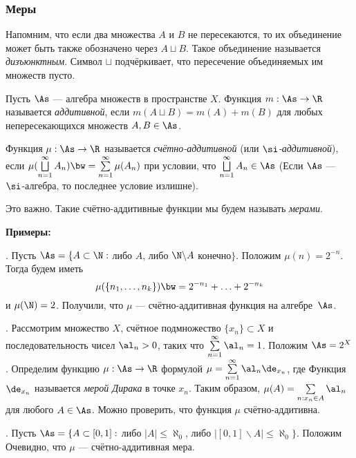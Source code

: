 \documentclass[10pt]{article}
\begin{document}
\subsubsection{Меры}\label{measures}

Напомним, что если два множества $A$ и $B$ не пересекаются, то их
объединение может быть также обозначено через $A\sqcup B$. Такое
объединение называется \emph{дизъюнктным}. Символ $\sqcup$
подчёркивает, что пересечение объединяемых им множеств пусто.

\begin{df}
Пусть $\As$ --- алгебра множеств в пространстве $X$. Функция
$m:\As\to\R$ называется \emph{аддитивной}, если $m(A\sqcup
B)=m(A)+m(B)$ для любых непересекающихся множеств $A,B\in\As$.
\end{df}

\begin{df}
Функция $\mu:\As\to\R$ называется \emph{счётно-аддитивной} (или
\emph{$\si$-аддитивной}), если $\mu(\bigsqcup\limits_{n=1}^\infty
A_n) \bw=\sum\limits_{n=1}^\infty\mu(A_n)$ при условии, что
$\bigsqcup\limits_{n=1}^\infty A_n\in\As$ (Если $\As$ ---
$\si$-алгебра, то последнее условие излишне).
\end{df}

\begin{note}
Это важно. Такие счётно-аддитивные функции мы будем называть
\emph{мерами}.
\end{note}

\textbf{Примеры:}

. Пусть $\As=\{A\subset\N:$ либо $A$, либо $\N\backslash A$
конечно$\}$. Положим $\mu(n)=2^{-n}$. Тогда будем иметь
$$\mu(\{n_1,\ldots,n_k\})\bw =2^{-n_1}+\ldots+2^{-n_k}$$
и $\mu(\N)=2$. Получили, что $\mu$ --- счётно-аддитивная функция на
алгебре~$\As$.

. Рассмотрим множество $X$, счётное подмножество
$\{x_n\}\subset X$ и последовательность чисел $\al_n>0$, таких что
$\sum\limits_{n=1}^\infty\al_n=1$. Положим $\As=2^X$. Определим
функцию $\mu:\As\to\R$ формулой
$\mu=\sum\limits_{n=1}^\infty\al_n\de_{x_n}$, где
 Функция $\de_{x_n}$ называется
\emph{мерой Дирака} в точке $x_n$. Таким образом,
$\mu(A)=\sum\limits_{n:x_n\in A}\al_n$ для любого $A\in\As$. Можно
проверить, что функция $\mu$ счётно-аддитивна.

. Пусть $\As=\{A\subset[0,1]:$ либо $|A|\le\aleph_0$, либо
$|[0,1]\backslash A|\le\aleph_0\}$. Положим  Очевидно, что $\mu$ --- счётно-аддитивная мера.
\end{document}
